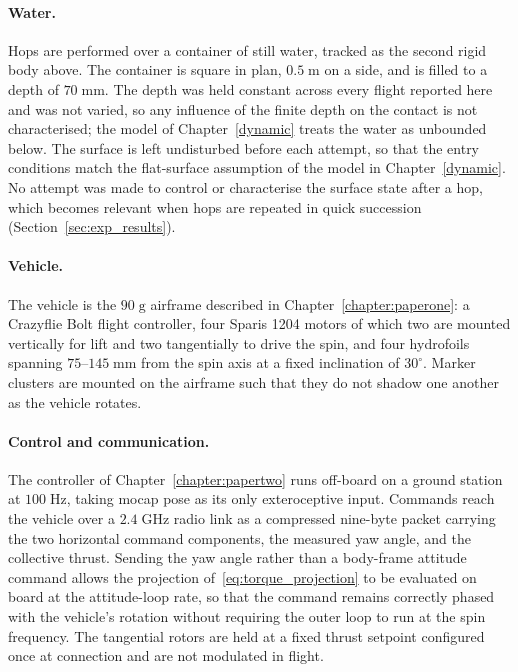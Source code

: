 \paragraph{Water.}
Hops are performed over a container of still water, tracked as the second
rigid body above.  The container is square in plan, $0.5\;\mathrm{m}$ on a
side, and is filled to a depth of $70\;\mathrm{mm}$.  The depth was held
constant across every flight reported here and was not varied, so any
influence of the finite depth on the contact is not characterised; the model
of Chapter~\ref{dynamic} treats the water as unbounded below.
The surface is left undisturbed before each attempt, so that the entry
conditions match the flat-surface assumption of the model in
Chapter~\ref{dynamic}.  No attempt was made to control or characterise the
surface state after a hop, which becomes relevant when hops are repeated in
quick succession (Section~\ref{sec:exp_results}).

\paragraph{Vehicle.}
The vehicle is the $90\;\mathrm{g}$ airframe described in
Chapter~\ref{chapter:paperone}: a Crazyflie Bolt flight controller, four
Sparis \mbox{1204} motors of which two are mounted vertically for lift and
two tangentially to drive the spin, and four hydrofoils spanning
$75$--$145\;\mathrm{mm}$ from the spin axis at a fixed inclination of
$30^{\circ}$.  Marker clusters are mounted on the airframe such that they do
not shadow one another as the vehicle rotates.

\paragraph{Control and communication.}
The controller of Chapter~\ref{chapter:papertwo} runs off-board on a ground
station at $100\;\mathrm{Hz}$, taking mocap pose as its only exteroceptive
input.  Commands reach the vehicle over a $2.4\;\mathrm{GHz}$ radio link as a
compressed nine-byte packet carrying the two horizontal command components,
the measured yaw angle, and the collective thrust.  Sending the yaw angle
rather than a body-frame attitude command allows the projection
of~\eqref{eq:torque_projection} to be evaluated on board at the attitude-loop
rate, so that the command remains correctly phased with the vehicle's
rotation without requiring the outer loop to run at the spin frequency.  The
tangential rotors are held at a fixed thrust setpoint configured once at
connection and are not modulated in flight.

